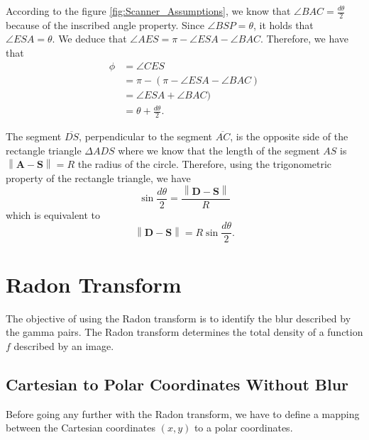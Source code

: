 \documentclass{article}
\begin{document}
According to the figure \ref{fig:Scanner_Assumptions}, we know that $\angle{BAC} = \frac{d\theta}{2}$ because of the inscribed angle property. Since $\angle{BSP} = \theta$, it holds that $\angle{ESA} = \theta$. We deduce that $\angle{AES} = \pi - \angle{ESA} - \angle{BAC}$. Therefore, we have that 
\begin{equation} \label{eq:Angle_Phi}
    \begin{aligned}
        \phi &= \angle{CES} \\
             &= \pi - (\pi - \angle{ESA} - \angle{BAC}) \\
             &= \angle{ESA} + \angle{BAC}) \\
             &= \theta + \frac{d\theta}{2}.
    \end{aligned}
\end{equation}

The segment $\overline{D S}$, perpendicular to the segment $\overline{A C}$, is the opposite side of the rectangle triangle $\Delta A D S$ where we know that the length of the segment $A S$ is $\left\| \mathbf{A} - \mathbf{S} \right\| = R$ the radius of the circle. Therefore, using the trigonometric property of the rectangle triangle, we have 
\begin{equation*}
    \sin \frac{d\theta}{2} = \frac{\left\| \mathbf{D} - \mathbf{S} \right\|}{R}
\end{equation*}
which is equivalent to
\begin{equation} \label{eq:Perp_Segment}
    \left\| \mathbf{D} - \mathbf{S} \right\| = R \sin \frac{d\theta}{2}.
\end{equation}


\section{Radon Transform}
The objective of using the Radon transform is to identify the blur described by the gamma pairs. The Radon transform determines the total density of a function $f$ described by an image.

\subsection{Cartesian to Polar Coordinates Without Blur}
Before going any further with the Radon transform, we have to define a mapping between the Cartesian coordinates $(x, y)$ to a polar coordinates.  
\end{document}

